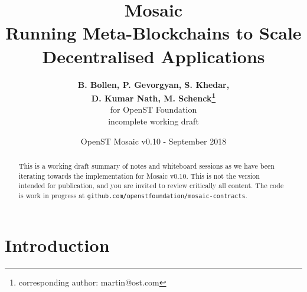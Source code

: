\documentclass[12pt,a4paper]{article}
\title{Mosaic\\\sc\Large{Running Meta-Blockchains to Scale Decentralised Applications}}
\author{\textbf{B. Bollen, P. Gevorgyan, S. Khedar,}\\ \textbf{D. Kumar Nath, M. Schenck\footnote{corresponding author: martin@ost.com}}\\ for OpenST Foundation \\ incomplete working draft}
\date{OpenST Mosaic v0.10 - September 2018}
\begin{document}
\maketitle

\begin{abstract}
This is a working draft summary of notes and whiteboard sessions as we have been iterating towards the implementation for Mosaic v0.10. This is not the version intended for publication, and you are invited to review critically all content. The code is work in progress at \verb|github.com/openstfoundation/mosaic-contracts|.
\end{abstract}

%
%
\section{Introduction}

%
%
%
% 
% 
% 
%
\end{document}
